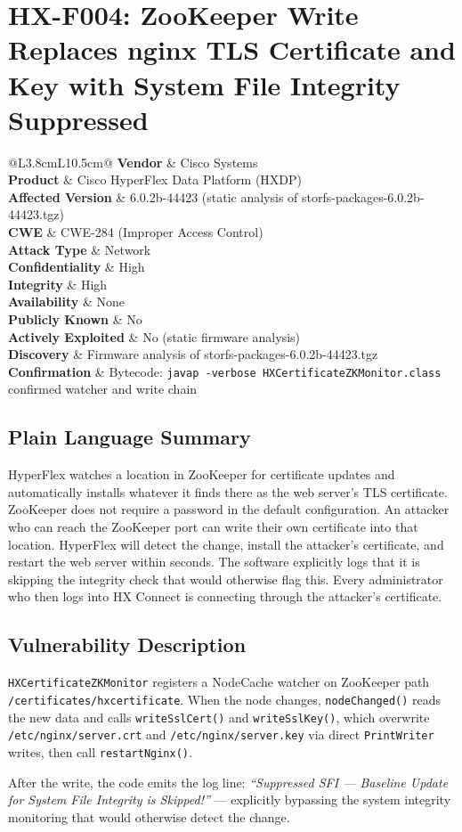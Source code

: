 \documentclass[11pt,a4paper]{article}
\makeatletter
\newcommand{\findingmeta}[9]{%
\begin{tabular}{@{}L{3.8cm}L{10.5cm}@{}}
\textbf{Vendor}             & Cisco Systems \\
\textbf{Product}            & Cisco HyperFlex Data Platform (HXDP) \\
\textbf{Affected Version}   & 6.0.2b-44423 (static analysis of storfs-packages-6.0.2b-44423.tgz) \\
\textbf{CWE}                & #1 \\
\textbf{Attack Type}        & #2 \\
\textbf{Confidentiality}    & #3 \\
\textbf{Integrity}          & #4 \\
\textbf{Availability}       & #5 \\
\textbf{Publicly Known}     & #6 \\
\textbf{Actively Exploited} & #7 \\
\textbf{Discovery}          & #8 \\
\textbf{Confirmation}       & #9 \\
\end{tabular}%
}
\makeatother
\begin{document}
\bigskip

\section{HX-F004: ZooKeeper Write Replaces nginx TLS Certificate and Key with System File Integrity Suppressed}

\findingmeta{CWE-284 (Improper Access Control)}{Network}{High}{High}{None}{No}{No (static firmware analysis)}{Firmware analysis of storfs-packages-6.0.2b-44423.tgz}{Bytecode: \texttt{javap -verbose HXCertificateZKMonitor.class} confirmed watcher and write chain}

\subsection*{Plain Language Summary}

HyperFlex watches a location in ZooKeeper for certificate updates and
automatically installs whatever it finds there as the web server's TLS
certificate. ZooKeeper does not require a password in the default configuration.
An attacker who can reach the ZooKeeper port can write their own certificate
into that location. HyperFlex will detect the change, install the attacker's
certificate, and restart the web server within seconds. The software explicitly
logs that it is skipping the integrity check that would otherwise flag this.
Every administrator who then logs into HX Connect is connecting through the
attacker's certificate.

\subsection*{Vulnerability Description}

\texttt{HXCertificateZKMonitor} registers a NodeCache watcher on ZooKeeper path
\texttt{/certificates/hxcertificate}. When the node changes, \texttt{nodeChanged()}
reads the new data and calls \texttt{writeSslCert()} and \texttt{writeSslKey()},
which overwrite \texttt{/etc/nginx/server.crt} and \texttt{/etc/nginx/server.key}
via direct \texttt{PrintWriter} writes, then call \texttt{restartNginx()}.

After the write, the code emits the log line: \textit{``Suppressed SFI ---
Baseline Update for System File Integrity is Skipped!''} --- explicitly bypassing
the system integrity monitoring that would otherwise detect the change.
\end{document}
